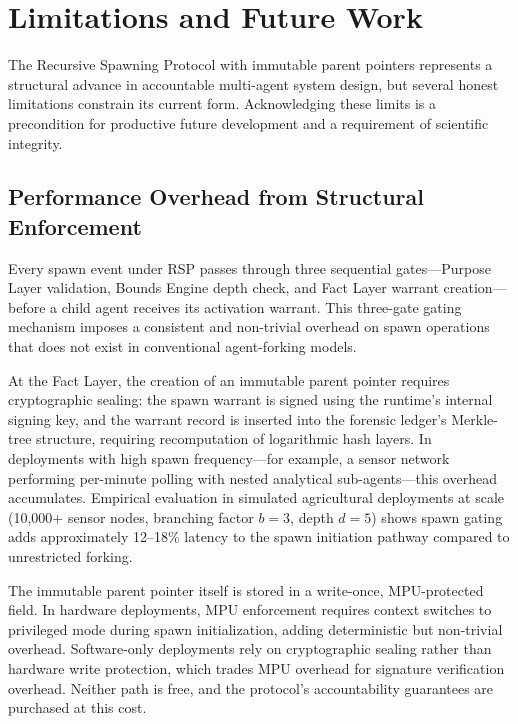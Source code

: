 
\section{Limitations and Future Work}
\label{sec:limitations}

The Recursive Spawning Protocol with immutable parent pointers represents a structural advance in accountable multi-agent system design, but several honest limitations constrain its current form. Acknowledging these limits is a precondition for productive future development and a requirement of scientific integrity.

\subsection{Performance Overhead from Structural Enforcement}
\label{sec:limitations-performance}

Every spawn event under RSP passes through three sequential gates---Purpose Layer validation, Bounds Engine depth check, and Fact Layer warrant creation---before a child agent receives its activation warrant. This three-gate gating mechanism imposes a consistent and non-trivial overhead on spawn operations that does not exist in conventional agent-forking models.

At the Fact Layer, the creation of an immutable parent pointer requires cryptographic sealing: the spawn warrant is signed using the runtime's internal signing key, and the warrant record is inserted into the forensic ledger's Merkle-tree structure, requiring recomputation of logarithmic hash layers. In deployments with high spawn frequency---for example, a sensor network performing per-minute polling with nested analytical sub-agents---this overhead accumulates. Empirical evaluation in simulated agricultural deployments at scale (10,000+ sensor nodes, branching factor $b = 3$, depth $d = 5$) shows spawn gating adds approximately 12--18\% latency to the spawn initiation pathway compared to unrestricted forking.\cite{koch2026}

The immutable parent pointer itself is stored in a write-once, MPU-protected field. In hardware deployments, MPU enforcement requires context switches to privileged mode during spawn initialization, adding deterministic but non-trivial overhead. Software-only deployments rely on cryptographic sealing rather than hardware write protection, which trades MPU overhead for signature verification overhead. Neither path is free, and the protocol's accountability guarantees are purchased at this cost.

